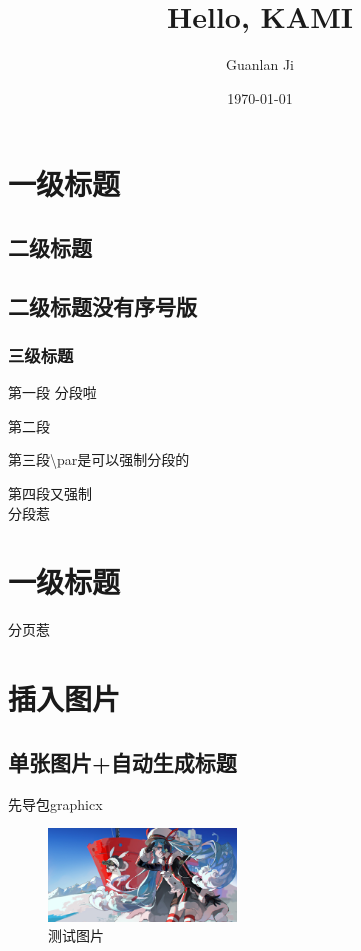 \documentclass[utf8]{ctexart}
\title{Hello, KAMI}
\author{Guanlan Ji}
\date{\today}
\begin{document}
\maketitle %

\tableofcontents

\section{一级标题}
\subsection{二级标题}
\subsection*{二级标题没有序号版}
\subsubsection{三级标题}
第一段
分段啦

第二段

第三段\textbackslash par是可以强制分段的 %

第四段又强制\\分段惹

\newpage %
\section{一级标题}
分页惹

\section{插入图片}
\subsection{单张图片+自动生成标题}
先导包graphicx
\begin{figure}[htbp] %
  \centering %
  \includegraphics[width=5cm]{testImg.jpg}
  \caption{测试图片}
\end{figure}
\end{document}
